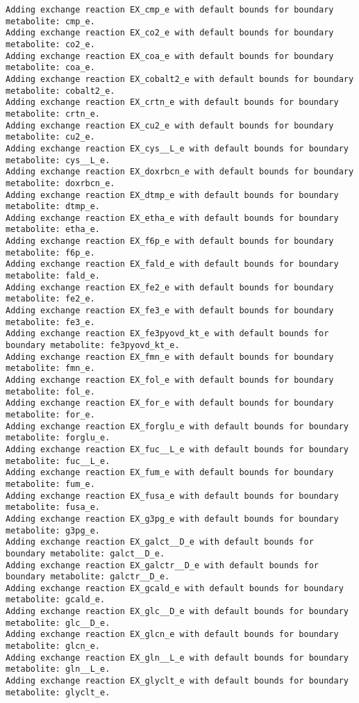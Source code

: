 \documentclass[
  letterpaper,
  DIV=11,
  numbers=noendperiod]{scrartcl}
\begin{document}
\begin{verbatim}
Adding exchange reaction EX_cmp_e with default bounds for boundary metabolite: cmp_e.
Adding exchange reaction EX_co2_e with default bounds for boundary metabolite: co2_e.
Adding exchange reaction EX_coa_e with default bounds for boundary metabolite: coa_e.
Adding exchange reaction EX_cobalt2_e with default bounds for boundary metabolite: cobalt2_e.
Adding exchange reaction EX_crtn_e with default bounds for boundary metabolite: crtn_e.
Adding exchange reaction EX_cu2_e with default bounds for boundary metabolite: cu2_e.
Adding exchange reaction EX_cys__L_e with default bounds for boundary metabolite: cys__L_e.
Adding exchange reaction EX_doxrbcn_e with default bounds for boundary metabolite: doxrbcn_e.
Adding exchange reaction EX_dtmp_e with default bounds for boundary metabolite: dtmp_e.
Adding exchange reaction EX_etha_e with default bounds for boundary metabolite: etha_e.
Adding exchange reaction EX_f6p_e with default bounds for boundary metabolite: f6p_e.
Adding exchange reaction EX_fald_e with default bounds for boundary metabolite: fald_e.
Adding exchange reaction EX_fe2_e with default bounds for boundary metabolite: fe2_e.
Adding exchange reaction EX_fe3_e with default bounds for boundary metabolite: fe3_e.
Adding exchange reaction EX_fe3pyovd_kt_e with default bounds for boundary metabolite: fe3pyovd_kt_e.
Adding exchange reaction EX_fmn_e with default bounds for boundary metabolite: fmn_e.
Adding exchange reaction EX_fol_e with default bounds for boundary metabolite: fol_e.
Adding exchange reaction EX_for_e with default bounds for boundary metabolite: for_e.
Adding exchange reaction EX_forglu_e with default bounds for boundary metabolite: forglu_e.
Adding exchange reaction EX_fuc__L_e with default bounds for boundary metabolite: fuc__L_e.
Adding exchange reaction EX_fum_e with default bounds for boundary metabolite: fum_e.
Adding exchange reaction EX_fusa_e with default bounds for boundary metabolite: fusa_e.
Adding exchange reaction EX_g3pg_e with default bounds for boundary metabolite: g3pg_e.
Adding exchange reaction EX_galct__D_e with default bounds for boundary metabolite: galct__D_e.
Adding exchange reaction EX_galctr__D_e with default bounds for boundary metabolite: galctr__D_e.
Adding exchange reaction EX_gcald_e with default bounds for boundary metabolite: gcald_e.
Adding exchange reaction EX_glc__D_e with default bounds for boundary metabolite: glc__D_e.
Adding exchange reaction EX_glcn_e with default bounds for boundary metabolite: glcn_e.
Adding exchange reaction EX_gln__L_e with default bounds for boundary metabolite: gln__L_e.
Adding exchange reaction EX_glyclt_e with default bounds for boundary metabolite: glyclt_e.

\end{verbatim}
\end{document}
